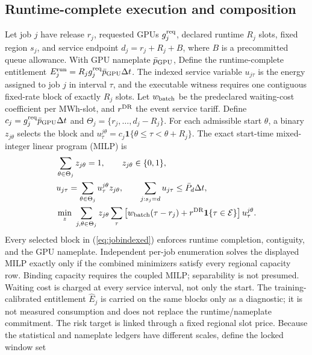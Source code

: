 \documentclass[10pt,journal]{IEEEtran}
\newcommand{\dt}{\Delta t}
\begin{document}
\subsection{Runtime-complete execution and composition}

Let job $j$ have release $r_j$, requested GPUs $g_j^{\rm req}$,
declared runtime $R_j$ slots, fixed region $s_j$, and service endpoint
$d_j=r_j+R_j+B$, where $B$ is a precommitted queue allowance. With GPU
nameplate $\bar p_{\rm GPU}$, Define the runtime-complete entitlement
\(E_j^{\rm run}=R_jg_j^{\rm req}\bar p_{\rm GPU}\dt\). The indexed service
variable \(u_{j\tau}\) is the energy assigned to job \(j\) in interval \(\tau\),
and the executable witness requires one contiguous fixed-rate block of exactly
\(R_j\) slots. Let \(w_{\rm batch}\) be the predeclared waiting-cost coefficient per
MWh-slot, and \(r^{\rm DR}\) the event service tariff. Define
\(c_j=g_j^{\rm req}\bar p_{\rm GPU}\dt\) and
\(\Theta_j=\{r_j,\ldots,d_j-R_j\}\). For each admissible start \(\theta\),
a binary \(z_{j\theta}\) selects the block and
\(u^{j\theta}_{\tau}=c_j\mathbf1\{\theta\leq\tau<\theta+R_j\}\). The exact
start-time mixed-integer linear program (MILP) is
\begin{equation}
\begin{aligned}
 &\sum_{\theta\in\Theta_j}z_{j\theta}=1,\qquad z_{j\theta}\in\{0,1\},\\
 &u_{j\tau}=\sum_{\theta\in\Theta_j}u^{j\theta}_{\tau}z_{j\theta},\qquad
   \sum_{j:s_j=d}u_{j\tau}\leq\bar P_d\dt,\\
 &\min_z\ \sum_{j,\theta\in\Theta_j}z_{j\theta}
   \sum_{\tau}\left[w_{\rm batch}(\tau-r_j)+r^{\rm DR}\mathbf1\{\tau\in\mathcal E\}\right]u^{j\theta}_{\tau}.
\end{aligned}
\label{eq:jobindexed}
\end{equation}
Every selected block in (\ref{eq:jobindexed}) enforces runtime completion, contiguity, and the GPU
nameplate. Independent per-job enumeration solves the displayed MILP exactly
only if the combined minimizers satisfy every regional capacity row. Binding
capacity requires the coupled MILP; separability is not presumed. Waiting cost is charged at every service interval, not only the start. The training-calibrated entitlement $\widehat E_j$ is carried on the same
blocks only as a diagnostic; it is not measured consumption and does not
replace the runtime/nameplate commitment.
The risk target is linked through a fixed
regional slot price. Because the statistical and nameplate ledgers have
different scales, define the locked window set
\end{document}
